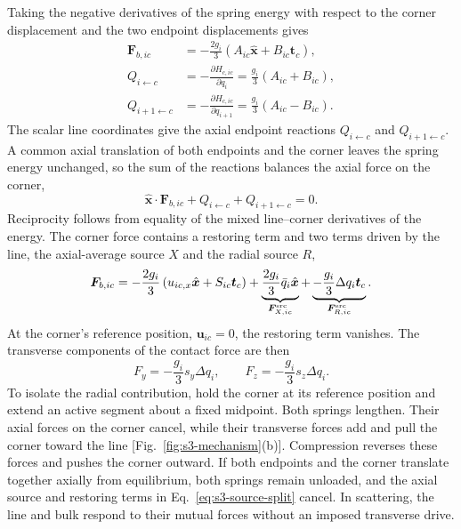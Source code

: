 \documentclass[10pt,aps,onecolumn,floatfix,notitlepage,nofootinbib,showkeys]{revtex4-2}
\newcommand{\vu}{\bm{u}}
\newcommand{\vF}{\bm{F}}
\newcommand{\vt}{\bm{t}}
\newcommand{\ex}{\hat{\bm{x}}}
\begin{document}
Taking the negative derivatives of the spring energy with respect to the corner displacement and the two endpoint displacements gives
\begin{align}
  \vF_{b,ic}
  &=-\frac{2g_i}{3}
  \left(A_{ic}\ex+B_{ic}\vt_c\right),
  \label{eq:s3-corner-force}\\
  Q_{i\leftarrow c}
  &=-\frac{\partial H_{c,ic}}{\partial q_i}
   =\frac{g_i}{3}(A_{ic}+B_{ic}),
  \label{eq:s3-left-generalized-force}\\
  Q_{i+1\leftarrow c}
  &=-\frac{\partial H_{c,ic}}{\partial q_{i+1}}
   =\frac{g_i}{3}(A_{ic}-B_{ic}).
  \label{eq:s3-right-generalized-force}
\end{align}
The scalar line coordinates give the axial endpoint reactions $Q_{i\leftarrow c}$ and $Q_{i+1\leftarrow c}$. A common axial translation of both endpoints and the corner leaves the spring energy unchanged, so the sum of the reactions balances the axial force on the corner,
\begin{equation}
  \ex\!\cdot\vF_{b,ic}
  +Q_{i\leftarrow c}+Q_{i+1\leftarrow c}=0.
  \label{eq:s3-axial-reciprocity}
\end{equation}
Reciprocity follows from equality of the mixed line--corner derivatives of the energy. The corner force contains a restoring term and two terms driven by the line, the axial-average source $X$ and the radial source $R$,
\begin{equation}
  \vF_{b,ic}
  =-\frac{2g_i}{3}
  \left(u_{ic,x}\ex+S_{ic}\vt_c\right)
  +\underbrace{\frac{2g_i}{3}\bar q_i\ex}_{\vF^{\rm src}_{X,ic}}
  +\underbrace{-\frac{g_i}{3}\Delta q_i\vt_c}_{\vF^{\rm src}_{R,ic}}.
  \label{eq:s3-source-split}
\end{equation}
At the corner's reference position, $\vu_{ic}=0$, the restoring term vanishes. The transverse components of the contact force are then
\begin{equation}
  F_y=-\frac{g_i}{3}s_y\Delta q_i,
  \qquad
  F_z=-\frac{g_i}{3}s_z\Delta q_i.
  \label{eq:s3-initial-transverse-force}
\end{equation}
To isolate the radial contribution, hold the corner at its reference position and extend an active segment about a fixed midpoint. Both springs lengthen. Their axial forces on the corner cancel, while their transverse forces add and pull the corner toward the line [Fig.~\ref{fig:s3-mechanism}(b)]. Compression reverses these forces and pushes the corner outward. If both endpoints and the corner translate together axially from equilibrium, both springs remain unloaded, and the axial source and restoring terms in Eq.~\eqref{eq:s3-source-split} cancel. In scattering, the line and bulk respond to their mutual forces without an imposed transverse drive.
\end{document}
